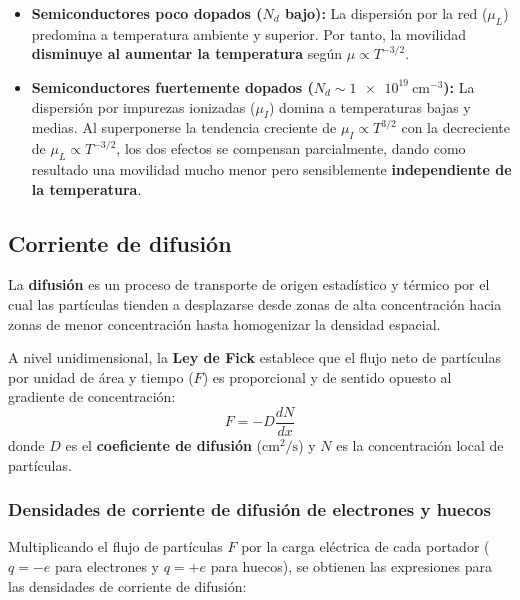 \begin{concepto}
\begin{itemize}
    \item \textbf{Semiconductores poco dopados ($N_d$ bajo):} La dispersión por la red ($\mu_L$) predomina a temperatura ambiente y superior. Por tanto, la movilidad \textbf{disminuye al aumentar la temperatura} según $\mu \propto T^{-3/2}$.
    \item \textbf{Semiconductores fuertemente dopados ($N_d \sim \SI{1e19}{\cm^{-3}}$):} La dispersión por impurezas ionizadas ($\mu_I$) domina a temperaturas bajas y medias. Al superponerse la tendencia creciente de $\mu_I \propto T^{3/2}$ con la decreciente de $\mu_L \propto T^{-3/2}$, los dos efectos se compensan parcialmente, dando como resultado una movilidad mucho menor pero sensiblemente \textbf{independiente de la temperatura}.
\end{itemize}
\end{concepto}

\newpage
\subsection{Corriente de difusión}

La \textbf{difusión} es un proceso de transporte de origen estadístico y térmico por el cual las partículas tienden a desplazarse desde zonas de alta concentración hacia zonas de menor concentración hasta homogenizar la densidad espacial.

A nivel unidimensional, la \textbf{Ley de Fick} establece que el flujo neto de partículas por unidad de área y tiempo ($F$) es proporcional y de sentido opuesto al gradiente de concentración:
\[
F = -D \frac{d N}{d x}
\]
donde $D$ es el \textbf{coeficiente de difusión} ($\si{\cm^2\per\second}$) y $N$ es la concentración local de partículas.

\subsubsection{Densidades de corriente de difusión de electrones y huecos}

Multiplicando el flujo de partículas $F$ por la carga eléctrica de cada portador ($q = -e$ para electrones y $q = +e$ para huecos), se obtienen las expresiones para las densidades de corriente de difusión:

